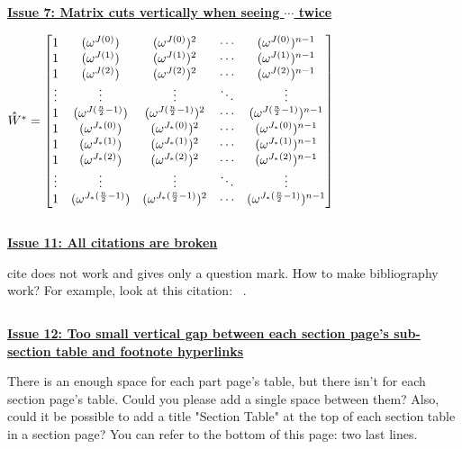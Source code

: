 
$ $

\underline{\textbf{Issue 7: Matrix cuts vertically when seeing $\cdots$ twice}}

\noindent $\hathat{W}^* = \begin{bmatrix}
1 & (\omega^{J(0)}) & (\omega^{J(0)})^2 & \cdots & (\omega^{J(0)})^{n-1}\\
1 & (\omega^{J(1)}) & (\omega^{J(1)})^2 & \cdots & (\omega^{J(1)})^{n-1}\\
1 & (\omega^{J(2)}) & (\omega^{J(2)})^2 & \cdots & (\omega^{J(2)})^{n-1}\\
\vdots & \vdots & \vdots & \ddots & \vdots \\
1 & (\omega^{J(\frac{n}{2}-1)}) & (\omega^{J(\frac{n}{2}-1)})^2 & \cdots & (\omega^{J(\frac{n}{2}-1)})^{n-1}\\
1 & (\omega^{J_*(0)}) & (\omega^{J_*(0)})^2 & \cdots & (\omega^{J_*(0)})^{n-1}\\
1 & (\omega^{J_*(1)}) & (\omega^{J_*(1)})^2 & \cdots & (\omega^{J_*(1)})^{n-1}\\
1 & (\omega^{J_*(2)}) & (\omega^{J_*(2)})^2 & \cdots & (\omega^{J_*(2)})^{n-1}\\
\vdots & \vdots & \vdots & \ddots & \vdots \\
1 & (\omega^{J_*(\frac{n}{2}-1)}) & (\omega^{J_*(\frac{n}{2}-1)})^2 & \cdots & (\omega^{J_*(\frac{n}{2}-1)})^{n-1}\\
\end{bmatrix}$

$ $

\underline{\textbf{Issue 11: All citations are broken}}

cite does not work and gives only a question mark. How to make bibliography work? For example, look at this citation: ~\cite{bgv-modswitch1}. 

$ $

\underline{\textbf{Issue 12: Too small vertical gap between each section page's sub-section table and footnote hyperlinks}}

There is an enough space for each part page's table, but there isn't for each section page's table. Could you please add a single space between them? Also, could it be possible to add a title "Section Table" at the top of each section table in a section page? You can refer to the bottom of this page: two last lines. 

